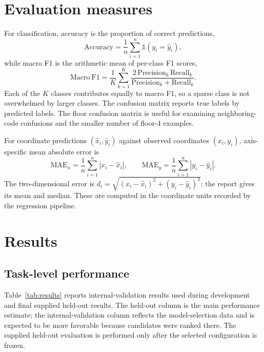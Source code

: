 \documentclass[conference]{IEEEtran}
\begin{document}
\section{Evaluation measures}
For classification, accuracy is the proportion of correct predictions,
\[
 \mathrm{Accuracy}=\frac{1}{n}\sum_{i=1}^{n}\mathbb{1}(y_i=\hat y_i),
\]
while macro F1 is the arithmetic mean of per-class F1 scores,
\[
 \mathrm{Macro\ F1}=\frac{1}{K}\sum_{k=1}^{K}
 \frac{2\,\mathrm{Precision}_k\,\mathrm{Recall}_k}
 {\mathrm{Precision}_k+\mathrm{Recall}_k}.
\]
Each of the \(K\) classes contributes equally to macro F1, so a sparse class is not overwhelmed by larger classes. The confusion matrix reports true labels by predicted labels. The floor confusion matrix is useful for examining neighboring-code confusions and the smaller number of floor-4 examples.

For coordinate predictions \((\hat{x}_i,\hat{y}_i)\) against observed coordinates \((x_i,y_i)\), axis-specific mean absolute error is
\[
 \mathrm{MAE}_{x}=\frac{1}{n}\sum_{i=1}^{n}|x_i-\hat{x}_i|,\qquad
 \mathrm{MAE}_{y}=\frac{1}{n}\sum_{i=1}^{n}|y_i-\hat{y}_i|.
\]
The two-dimensional error is \(d_i=\sqrt{(x_i-\hat{x}_i)^2+(y_i-\hat{y}_i)^2}\); the report gives its mean and median. These are computed in the coordinate units recorded by the regression pipeline.

\section{Results}
\subsection{Task-level performance}
Table~\ref{tab:results} reports internal-validation results used during development and final supplied held-out results. The held-out column is the main performance estimate; the internal-validation column reflects the model-selection data and is expected to be more favorable because candidates were ranked there. The supplied held-out evaluation is performed only after the selected configuration is frozen.
\end{document}
